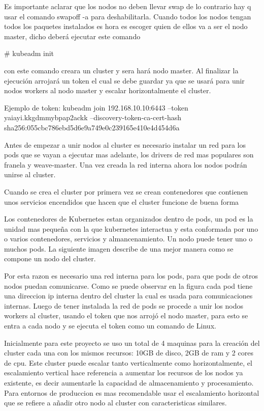      Es importante aclarar que los nodos no deben llevar swap de lo contrario hay q usar el comando swapoff -a para deshabilitarla.
     Cuando todos los nodos tengan todos los paquetes instalados es hora es escoger quien de ellos va a ser el nodo master, dicho deberá ejecutar este comando
     
     \# kubeadm init
     
     con este comando creara un cluster y sera hará nodo master.
     Al finalizar la ejecución arrojará un token el cual se debe guardar ya que se usará para unir nodos workers al nodo master y escalar horizontalmente el cluster.
     
     Ejemplo de token: kubeadm join 192.168.10.10:6443 --token yaiayi.kkgdmmybpap2ackk --discovery-token-ca-cert-hash sha256:055cbc786ebd5d6e9a749e0c239165e410e4d454d6a

     
     Antes de empezar a unir nodos al cluster es necesario instalar un red para los pods que se vayan a ejecutar mas adelante, los drivers de red mas populares son franela y weave-master.
     Una vez creada la red interna ahora los nodos podrán unirse al cluster.
     
     Cuando se crea el cluster por primera vez se crean contenedores que contienen unos servicios encendidos que hacen que el cluster funcione de buena forma
     
     Los contenedores de Kubernetes estan organizados dentro de pods, un pod es la unidad mas pequeña con la que kubernetes interactua y esta conformada por uno o varios contenedores, servicios y almancenamiento. Un nodo puede tener uno o muchos pods. La siguiente imagen describe de una mejor manera como se compone un nodo del cluster.
      
      
      Por esta razon es necesario una red interna para los pods, para que pods de otros nodos puedan comunicarse.
      Como se puede observar en la figura cada pod tiene una direccion ip interna dentro del cluster la cual es usada para comunicaciones internas.
      Luego de tener instalada la red de pods se procede a unir los nodos workers al cluster, usando el token que nos arrojó el nodo master, para esto se entra a cada nodo y se ejecuta el token como un comando de Linux.
      
      Inicialmente para este proyecto se uso un total de 4 maquinas para la creación del cluster cada una con los mismos recursos: 10GB de disco, 2GB de ram y 2 cores de cpu.
      Este cluster puede escalar tanto verticalmente como horizontalmente, el escalamiento vertical hace referencia a aumentar los recursos de los nodos ya existente, es decir aumentarle la capacidad de almacenamiento y procesamiento. Para entornos de produccion es mas recomendable usar el escalamiento horizontal que se refiere a añadir otro nodo al cluster con caracteristicas similares.
      
